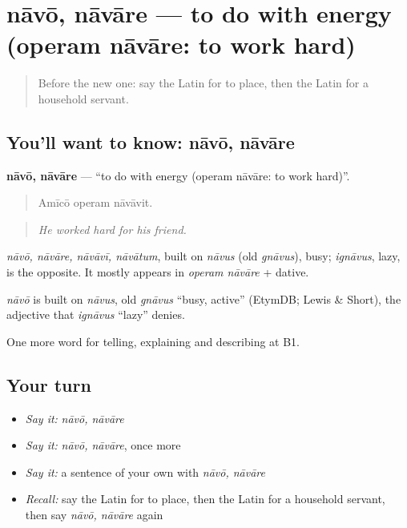 \section[nāvō, nāvāre]{nāvō, nāvāre — to do with energy (operam nāvāre: to work hard)}

\label{lesson:LA-C380-navo}



\begin{quote}
Before the new one: say the Latin for to place, then the Latin for a household servant.
\end{quote}

\subsection*{You'll want to know: nāvō, nāvāre}
\textbf{nāvō, nāvāre} — \textquotedblleft{}to do with energy (operam nāvāre: to work hard)\textquotedblright{}.

\begin{quote}
Amīcō operam nāvāvit.
\end{quote}

\begin{quote}
\emph{He worked hard for his friend.}
\end{quote}

\emph{nāvō, nāvāre, nāvāvī, nāvātum}, built on \emph{nāvus} (old \emph{gnāvus}), busy; \emph{ignāvus}, lazy, is the opposite. It mostly appears in \emph{operam nāvāre} + dative.

\begin{cousinweb}
\emph{nāvō} is built on \emph{nāvus}, old \emph{gnāvus} \textquotedblleft{}busy, active\textquotedblright{} (EtymDB; Lewis \& Short), the adjective that \emph{ignāvus} \textquotedblleft{}lazy\textquotedblright{} denies.
\end{cousinweb}

\begin{grammarlens}[title={What you've built}]
One more word for telling, explaining and describing at B1.
\end{grammarlens}

\subsection*{Your turn}
\begin{itemize}
\raggedright
  \item \emph{Say it:} \emph{nāvō, nāvāre}
  \item \emph{Say it:} \emph{nāvō, nāvāre}, once more
  \item \emph{Say it:} a sentence of your own with \emph{nāvō, nāvāre}
  \item \emph{Recall:} say the Latin for to place, then the Latin for a household servant, then say \emph{nāvō, nāvāre} again
\end{itemize}

